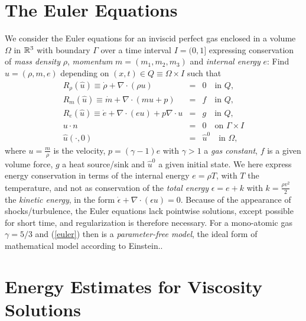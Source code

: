 \section{The Euler Equations}
We consider the Euler equations for an inviscid perfect gas
enclosed in a volume $\Omega$ in ${\Bbb{R}}^3$ with boundary $\Gamma$
over a time interval $I=(0,1]$ expressing conservation of
\emph{mass density} $\rho$, \emph{momentum} $m=(m_1,m_2,m_3)$ and
\emph{internal energy} $e$:
Find $\hat u=(\rho ,m,e)$
depending on $(x,t)\in Q\equiv \Omega\times I$ such that
\begin{equation}\label{euler}
\begin{array}{rcl}
R_\rho (\hat u)\equiv\dot \rho +\nabla\cdot (\rho u )&=&  0 \quad \mbox{in } Q,
\\
R_m(\hat u)\equiv\dot m +\nabla\cdot (mu +p)&=&  f \quad \mbox{in } Q, \\
R_e(\hat u)\equiv\dot e +\nabla\cdot (eu)+p\nabla\cdot u &=& g  \quad \mbox{in }
Q,\\
u\cdot n&=&0\quad \mbox{on } \Gamma\times I\\
\hat u(\cdot ,0)&=&\hat u^0\quad \mbox{in } \Omega ,
\end{array}
\end{equation}
where $u=\frac{m}{\rho}$ is the velocity,
$p=(\gamma -1)e$ with $\gamma >1$ a \emph{gas constant},
$f$ is a given volume force, $g$ a heat source/sink and $\hat u^0$
a given initial state. We here express
energy conservation in terms of the internal energy $e=\rho T$,
with $T$ the temperature, and not
as conservation of the \emph{total energy}
$\epsilon =e+k$ with $k=\frac{\rho v^2}{2}$ the \emph{kinetic energy},
in the form $\dot\epsilon +\nabla\cdot (\epsilon u)= 0$. Because
of the appearance of shocks/turbulence, the Euler equations lack
pointwise solutions, except possible for short time, and
regularization is therefore necessary. For a mono-atomic gas
$\gamma =5/3$ and (\ref{euler}) then is a \emph{parameter-free model},
the ideal form of mathematical model according to Einstein..



\section{Energy Estimates for Viscosity Solutions}

